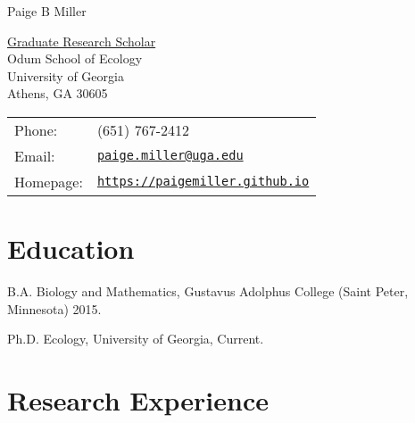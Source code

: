 \documentclass[letterpaper]{article}
\def\name{Paige B Miller}
\renewenvironment{itemize}{
  \begin{list}{}{
    \setlength{\leftmargin}{1.5em}
  }
}{
  \end{list}
}
\begin{document}
{\huge \name}


\vspace{0.25in}

\begin{minipage}{0.45\linewidth}
  \href{}{Graduate Research Scholar} \\
  Odum School of Ecology \\
  University of Georgia \\
  Athens, GA 30605
\end{minipage}
\begin{minipage}{0.45\linewidth}
  \begin{tabular}{ll}
    Phone: & (651) 767-2412 \\
    Email: & \href{mailto:paige.miller@uga.edu}{\tt paige.miller@uga.edu} \\
    Homepage: & \href{https://paigemiller.github.io}{\tt https://paigemiller.github.io} \\
  \end{tabular}
\end{minipage}

\section*{Education}

\begin{itemize}
  \item B.A. Biology and Mathematics, Gustavus Adolphus College (Saint Peter, Minnesota) 2015.

  \item Ph.D. Ecology, University of Georgia, Current.
\end{itemize}

\section*{Research Experience}
\end{document}
